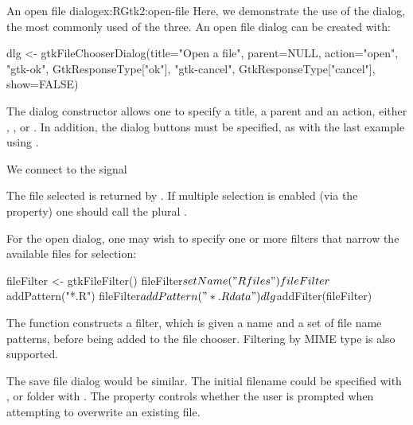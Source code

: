 \begin{example}{An open file dialog}{ex:RGtk2:open-file}
  Here, we demonstrate the use of the dialog, the most commonly used
  of the three.  An open file dialog can be created with:
\begin{Schunk}
\begin{Sinput}
 dlg <- gtkFileChooserDialog(title="Open a file", 
                      parent=NULL, action="open",
                      "gtk-ok", GtkResponseType["ok"],
                      "gtk-cancel", GtkResponseType["cancel"],
                      show=FALSE)
\end{Sinput}
\end{Schunk}
  The dialog constructor allows one to specify a title, a parent and an
  action, either , ,  or
  . In addition, the dialog buttons must be
  specified, as with the last example using
  .

  We connect to the  signal
\begin{Schunk}
\end{Schunk}
  The file selected is returned by
  . If multiple selection is enabled
  (via the  property) one should call the
  plural .

  For the open dialog, one may wish to specify one or more filters that
  narrow the available files for selection:
\begin{Schunk}
\begin{Sinput}
 fileFilter <- gtkFileFilter()
 fileFilter$setName("R files")
 fileFilter$addPattern("*.R")
 fileFilter$addPattern("*.Rdata")
 dlg$addFilter(fileFilter)
\end{Sinput}
\end{Schunk}
  The  function constructs a filter, which is
  given a name and a set of file name patterns, before being added to
  the file chooser. Filtering by MIME type is also supported.

\end{example}

The save file dialog would be similar. The initial filename could be
specified with , or folder with
. The
 property controls whether the user is
prompted when attempting to overwrite an existing file.

